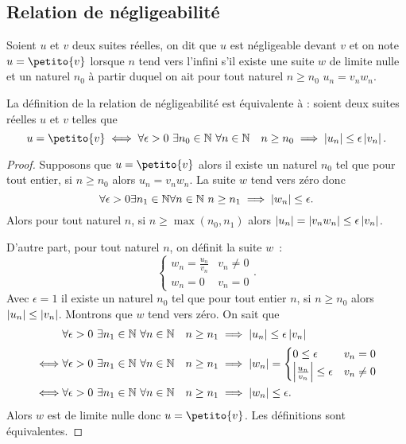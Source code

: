 \subsection{Relation de négligeabilité}

\begin{defdef}
  Soient $u$ et $v$ deux suites réelles, on dit que $u$ est négligeable devant $v$ et on note $u=\petito{v}$ lorsque $n$ tend vers l'infini s'il existe une suite $w$ de limite nulle et un naturel $n_0$ à partir duquel on ait pour tout naturel $n \geq n_0$ $u_n = v_n w_n$.
\end{defdef}
\begin{prop}
  La définition de la relation de négligeabilité est équivalente à : soient deux suites réelles $u$ et $v$ telles que
  \begin{equation}
    u=\petito{v} \iff \forall \epsilon > 0 \ \exists n_0 \in \N \ \forall n \in \N \quad n \geq n_0 \implies \abs{u_n} \leq \epsilon \abs{v_n}.
  \end{equation}
\end{prop}
\begin{proof}
  Supposons que $u=\petito{v}$ alors il existe un naturel $n_0$ tel que pour tout entier, si $n \geq n_0$ alors $u_n = v_n w_n$. La suite $w$ tend vers zéro donc
  \begin{equation}
    \forall \epsilon > 0 \exists n_1 \in \mathbb{N} \forall n \in \mathbb{N} \ n \geq n_1 \implies \left\lvert w_n\right\rvert \leq \epsilon.
  \end{equation}
  Alors pour tout naturel $n$, si $n \geq \max(n_0, n_1)$ alors $\left\lvert u_n\right\rvert = \left\lvert v_n w_n\right\rvert \leq \epsilon \left\lvert v_n\right\rvert$.

  D'autre part, pour tout naturel $n$, on définit la suite $w$~:
  \begin{equation}
    \begin{cases} w_n=\frac{u_n}{v_n} & v_n \neq 0 \\ w_n=0 & v_n=0\end{cases}.
  \end{equation}
  Avec $\epsilon=1$ il existe un naturel $n_0$ tel que pour tout entier $n$, si $n \geq n_0$ alors $\left\lvert u_n\right\rvert \leq \left\lvert v_n\right\rvert$. Montrons que $w$ tend vers zéro. On sait que
  \begin{align}
    & \forall \epsilon > 0 \ \exists n_1 \in \mathbb{N} \ \forall n \in \mathbb{N} \quad n \geq n_1 \implies \left\lvert u_n\right\rvert \leq \epsilon \left\lvert v_n\right\rvert \\ 
    \iff & \forall \epsilon > 0 \ \exists n_1 \in \mathbb{N} \ \forall n \in \mathbb{N} \quad n \geq n_1 \implies \left\lvert w_n\right\rvert= \begin{cases} 0 \leq \epsilon & v_n=0 \\ \left\lvert\frac{u_n}{v_n}\right\rvert \leq \epsilon & v_n\neq 0 \end{cases} \\
    \iff & \forall \epsilon > 0 \ \exists n_1 \in \mathbb{N} \ \forall n \in \mathbb{N} \quad n \geq n_1 \implies \left\lvert w_n\right\rvert \leq \epsilon.
  \end{align}
  Alors $w$ est de limite nulle donc $u=\petito{v}$. Les définitions sont équivalentes.
\end{proof}
